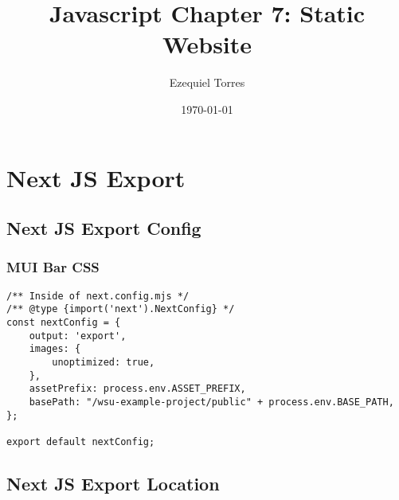 \documentclass{beamer}
\begin{document}
\title{Javascript Chapter 7: Static Website}
\author{Ezequiel Torres}
\date{\today}
\frame{\titlepage}

\section{Next JS Export}

\subsection{Next JS Export Config}
\begin{frame}[fragile]
\frametitle{MUI Bar CSS}
\begin{lstlisting}
/** Inside of next.config.mjs */
/** @type {import('next').NextConfig} */
const nextConfig = {
    output: 'export',
    images: {
        unoptimized: true,
    },
    assetPrefix: process.env.ASSET_PREFIX,
    basePath: "/wsu-example-project/public" + process.env.BASE_PATH,
};

export default nextConfig;
\end{lstlisting}
\end{frame}

\subsection{Next JS Export Location}
\end{document}

